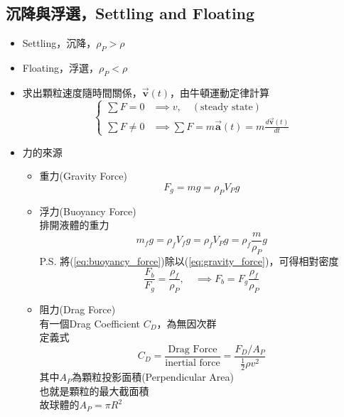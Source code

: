 \documentclass[../main.tex]{subfiles}
\begin{document}
\subsection{沉降與浮選，Settling and Floating}
\begin{itemize}
  \item Settling，沉降，$\rho_P > \rho$
  \item Floating，浮選，$\rho_P < \rho$
  \item 求出顆粒速度隨時間關係，$\vec{\bm v}(t)$，由牛頓運動定律計算
  \begin{equation}
    \begin{cases}
      \sum F = 0 & \implies v,\quad (\text{steady state}) \\
      \sum F \neq 0 & \implies \sum F = m\vec{\bm a}(t) = m\frac{d\vec{\bm v}(t)}{dt}
    \end{cases}
  \end{equation}
  \item 力的來源
  \begin{itemize}
    \item 重力(Gravity Force)
    \begin{equation}
      F_g = mg = \rho_P V_P g \label{eq:gravity_force}
    \end{equation}
    \item 浮力(Buoyancy Force)\\
    排開液體的重力
    \begin{equation}
      m_fg = \rho_f V_f g = \rho_f V_P g = \rho_f\frac{m}{\rho_P} g \label{eq:buoyancy_force}
    \end{equation}
    P.S. 將(\ref{eq:buoyancy_force})除以(\ref{eq:gravity_force})，可得相對密度
    \begin{equation}
      \frac{F_b}{F_g} = \frac{\rho_f}{\rho_P},\quad \implies F_b = F_g \frac{\rho_f}{\rho_P} \label{eq:relative_density}
    \end{equation}
    \item 阻力(Drag Force)\\
    有一個Drag Coefficient $C_D$，為無因次群\\
    定義式
    \begin{equation}
      C_D = \frac{\text{Drag Force}}{\text{inertial force}} = \frac{F_D/A_P}{\frac{1}{2}\rho v^2} \label{eq:drag_coefficient_definition}
    \end{equation}
    其中$A_P$為顆粒投影面積(Perpendicular Area)\\
    也就是顆粒的最大截面積\\
    故球體的$A_P = \pi R^2$

\end{itemize}
\end{itemize}
\end{document}

